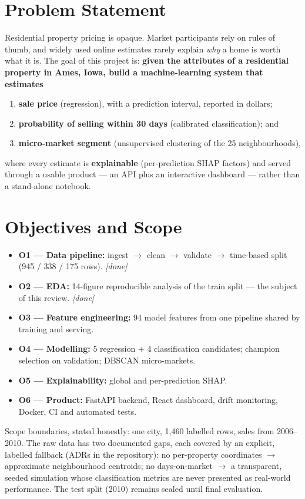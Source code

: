 \documentclass[11pt,a4paper]{article}
\begin{document}
\section{Problem Statement}
Residential property pricing is opaque. Market participants rely on rules of
thumb, and widely used online estimates rarely explain \emph{why} a home is
worth what it is. The goal of this project is: \textbf{given the attributes of
a residential property in Ames, Iowa, build a machine-learning system that
estimates}
\begin{enumerate}
  \item \textbf{sale price} (regression), with a prediction interval, reported
        in dollars;
  \item \textbf{probability of selling within 30 days} (calibrated
        classification); and
  \item \textbf{micro-market segment} (unsupervised clustering of the 25
        neighbourhoods),
\end{enumerate}
where every estimate is \textbf{explainable} (per-prediction SHAP factors) and
served through a usable product --- an API plus an interactive dashboard ---
rather than a stand-alone notebook.

\section{Objectives and Scope}
\begin{itemize}
  \item \textbf{O1 --- Data pipeline:} ingest $\rightarrow$ clean $\rightarrow$
        validate $\rightarrow$ time-based split (945 / 338 / 175 rows).
        \hfill\emph{[done]}
  \item \textbf{O2 --- EDA:} 14-figure reproducible analysis of the train
        split --- the subject of this review. \hfill\emph{[done]}
  \item \textbf{O3 --- Feature engineering:} 94 model features from one
        pipeline shared by training and serving.
  \item \textbf{O4 --- Modelling:} 5 regression + 4 classification candidates;
        champion selection on validation; DBSCAN micro-markets.
  \item \textbf{O5 --- Explainability:} global and per-prediction SHAP.
  \item \textbf{O6 --- Product:} FastAPI backend, React dashboard, drift
        monitoring, Docker, CI and automated tests.
\end{itemize}
Scope boundaries, stated honestly: one city, 1{,}460 labelled rows, sales from
2006--2010. The raw data has two documented gaps, each covered by an explicit,
labelled fallback (ADRs in the repository): no per-property coordinates
$\rightarrow$ approximate neighbourhood centroids; no days-on-market
$\rightarrow$ a transparent, seeded simulation whose classification metrics are
never presented as real-world performance. The test split (2010) remains sealed
until final evaluation.
\end{document}
